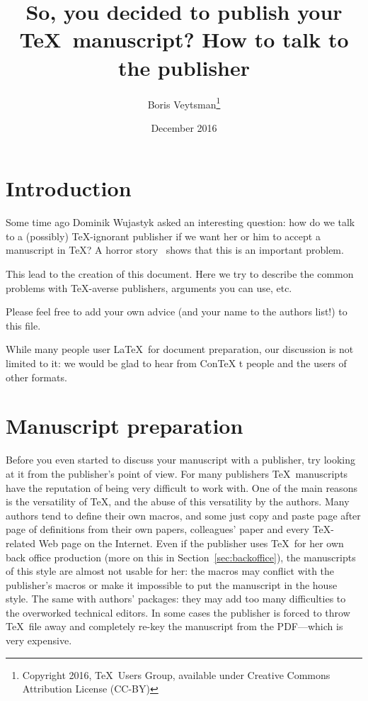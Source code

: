 \documentclass{article}
\begin{document}
\title{So, you decided to publish your \TeX\ manuscript?  How to talk
  to the publisher}
\author{Boris Veytsman\thanks{Copyright 2016, \TeX\ Users Group,
    available under Creative Commons Attribution License (CC-BY)}}
\date{December 2016}
\maketitle

\section{Introduction}
\label{sec:intro}

Some time ago Dominik Wujastyk asked an interesting question: how do
we talk to a (possibly) \TeX-ignorant publisher if we want her or him
to accept a manuscript in \TeX?  A horror story~\cite{Verna13} shows
that this is an important problem.

This lead to the creation of this document.  Here we try to describe
the common problems with \TeX-averse publishers, arguments you can
use, etc.


Please feel free to add your own advice (and your name to the authors
list!) to this file.  

While many people user \LaTeX\ for document preparation, our
discussion is not limited to it: we would be glad to hear from Con\TeX
t people and the users of other formats.  


\section{Manuscript preparation}
\label{sec:preparation}

Before you even started to discuss your manuscript with a publisher,
try looking at it from the publisher's point of view.  For many
publishers \TeX\ manuscripts have the reputation of being very
difficult to work with.  One of the main reasons is the versatility of
\TeX, and the abuse of this versatility by the authors.  Many authors
tend to define their own macros, and some just copy and paste page
after page of definitions from their own papers, colleagues' paper and
every \TeX-related Web page on the Internet.  Even if the publisher
uses \TeX\ for her own back office production (more on this in
Section~\ref{sec:backoffice}), the manuscripts of this style are
almost not usable for her: the macros may conflict with the
publisher's macros or make it impossible to put the manuscript in the
house style.  The same with authors' packages: they may add too many
difficulties to the overworked technical editors.  In some cases the
publisher is forced to throw \TeX\ file away and completely re-key the
manuscript from the PDF---which is very expensive.
\end{document}
